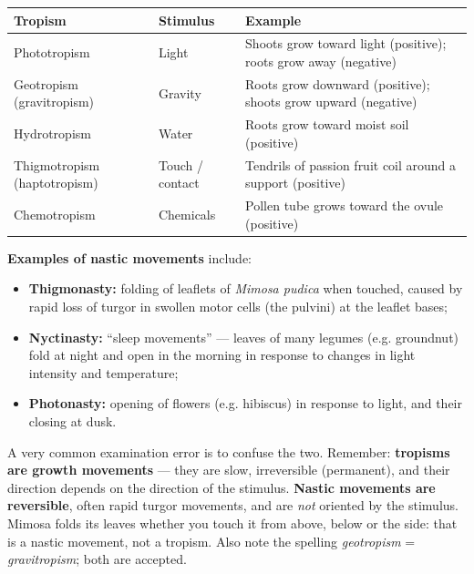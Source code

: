 \documentclass[11pt]{article}
\newcommand{\cle}[1]{{\popxbold\color{popdark}#1}}
\begin{document}
\begin{center}
\begin{tabularx}{\linewidth}{|l|l|X|}
\hline
\rowcolor{popblueL} \textbf{Tropism} & \textbf{Stimulus} & \textbf{Example} \\
\hline
Phototropism & Light & Shoots grow toward light (positive); roots grow away (negative) \\
\hline
Geotropism (gravitropism) & Gravity & Roots grow downward (positive); shoots grow upward (negative) \\
\hline
Hydrotropism & Water & Roots grow toward moist soil (positive) \\
\hline
Thigmotropism (haptotropism) & Touch / contact & Tendrils of passion fruit coil around a support (positive) \\
\hline
Chemotropism & Chemicals & Pollen tube grows toward the ovule (positive) \\
\hline
\end{tabularx}
\end{center}

\textbf{Examples of nastic movements} include:
\begin{itemize}
\item \textbf{Thigmonasty:} folding of leaflets of \emph{Mimosa pudica} when touched, caused by rapid loss of turgor in swollen motor cells (the \cle{pulvini}) at the leaflet bases;
\item \textbf{Nyctinasty:} ``sleep movements'' — leaves of many legumes (e.g. groundnut) fold at night and open in the morning in response to changes in light intensity and temperature;
\item \textbf{Photonasty:} opening of flowers (e.g. hibiscus) in response to light, and their closing at dusk.
\end{itemize}

\begin{attention}
A very common examination error is to confuse the two. Remember: \textbf{tropisms are growth movements} — they are slow, irreversible (permanent), and their direction depends on the direction of the stimulus. \textbf{Nastic movements are reversible}, often rapid turgor movements, and are \emph{not} oriented by the stimulus. Mimosa folds its leaves whether you touch it from above, below or the side: that is a nastic movement, not a tropism. Also note the spelling \emph{geotropism} = \emph{gravitropism}; both are accepted.
\end{attention}
\end{document}

